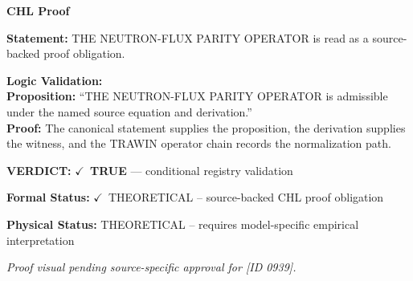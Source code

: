 \vspace{0.45em}
\noindent\textbf{CHL Proof}\par
\textbf{Statement:} THE NEUTRON-FLUX PARITY OPERATOR is read as a source-backed proof obligation.

\textbf{Logic Validation:}\\
\textbf{Proposition:} ``THE NEUTRON-FLUX PARITY OPERATOR is admissible under the named source equation and derivation.''\\
\textbf{Proof:} The canonical statement supplies the proposition, the derivation supplies the witness, and the TRAWIN operator chain records the normalization path.

\textbf{VERDICT:} \ensuremath{\checkmark}\ \textbf{TRUE} --- conditional registry validation

\textbf{Formal Status:} \ensuremath{\checkmark}\ THEORETICAL -- source-backed CHL proof obligation

\textbf{Physical Status:} THEORETICAL -- requires model-specific empirical interpretation
\par\vspace{0.45em}
\par
\vfill
\begingroup\footnotesize\itshape
Proof visual pending source-specific approval for [ID 0939].
\par\endgroup
\vfill
\endgroup
\endgroup
